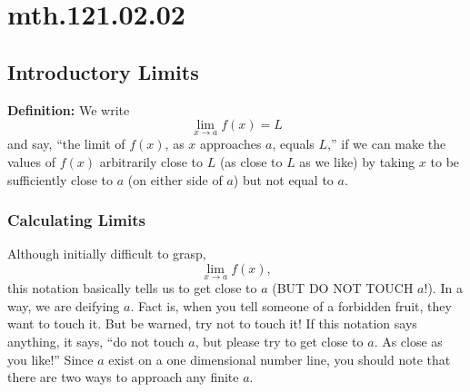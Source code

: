 \documentclass[12pt,addpoints, answers, fleqn]{exam}
\begin{document}
\section{mth.121.02.02}



\subsection{Introductory Limits}

\textbf{Definition:} We write
\[
\mathop {\lim }\limits_{x \to a }  f \left( x \right) = L
\]
and say, ``the limit of $f \left( x \right)$, as $x$ approaches $a$, equals $L$,'' if we can make the values of $f \left( x \right)$ arbitrarily close to $L$ (as close to $L$ as we like) by taking $x$ to be sufficiently close to $a$ (on either side of $a$) but not equal to $a$.




\subsubsection{Calculating Limits}


Although initially difficult to grasp,
\[
\mathop {\lim }\limits_{x \to a}  f \left( x \right),
\]
this notation basically tells us to get close to $a$ (BUT DO NOT TOUCH $a$!). In a way, we are deifying $a$. Fact is, when you tell someone of a forbidden fruit, they want to touch it. But be warned, try not to touch it! If this notation says anything, it says, ``do not touch $a$, but please try to get close to $a$. As close as you like!'' Since $a$ exist on a one dimensional number line, you should note that there are two ways to approach any finite $a$.
\end{document}
